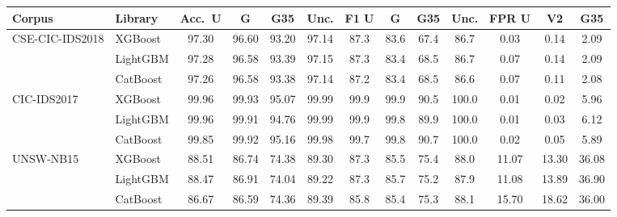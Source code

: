 \begin{tabular}{@{}llccccccccccc@{}}
\toprule
\textbf{Corpus} & \textbf{Library} & \textbf{Acc.\ U} & \textbf{G} & \textbf{G35} & \textbf{Unc.} & \textbf{F1 U} & \textbf{G} & \textbf{G35} & \textbf{Unc.} & \textbf{FPR U} & \textbf{V2} & \textbf{G35} \\
\midrule
CSE-CIC-IDS2018 & XGBoost & 97.30 & 96.60 & 93.20 & 97.14 & 87.3 & 83.6 & 67.4 & 86.7 & 0.03 & 0.14 & 2.09 \\
 & LightGBM & 97.28 & 96.58 & 93.39 & 97.15 & 87.3 & 83.4 & 68.5 & 86.7 & 0.07 & 0.14 & 2.09 \\
 & CatBoost & 97.26 & 96.58 & 93.38 & 97.14 & 87.2 & 83.4 & 68.5 & 86.6 & 0.07 & 0.11 & 2.08 \\
\midrule
CIC-IDS2017 & XGBoost & 99.96 & 99.93 & 95.07 & 99.99 & 99.9 & 99.9 & 90.5 & 100.0 & 0.01 & 0.02 & 5.96 \\
 & LightGBM & 99.96 & 99.91 & 94.76 & 99.99 & 99.9 & 99.8 & 89.9 & 100.0 & 0.01 & 0.03 & 6.12 \\
 & CatBoost & 99.85 & 99.92 & 95.16 & 99.98 & 99.7 & 99.8 & 90.7 & 100.0 & 0.02 & 0.05 & 5.89 \\
\midrule
UNSW-NB15 & XGBoost & 88.51 & 86.74 & 74.38 & 89.30 & 87.3 & 85.5 & 75.4 & 88.0 & 11.07 & 13.30 & 36.08 \\
 & LightGBM & 88.47 & 86.91 & 74.04 & 89.22 & 87.3 & 85.7 & 75.2 & 87.9 & 11.08 & 13.89 & 36.90 \\
 & CatBoost & 86.67 & 86.59 & 74.36 & 89.39 & 85.8 & 85.4 & 75.3 & 88.1 & 15.70 & 18.62 & 36.00 \\
\bottomrule
\end{tabular}
